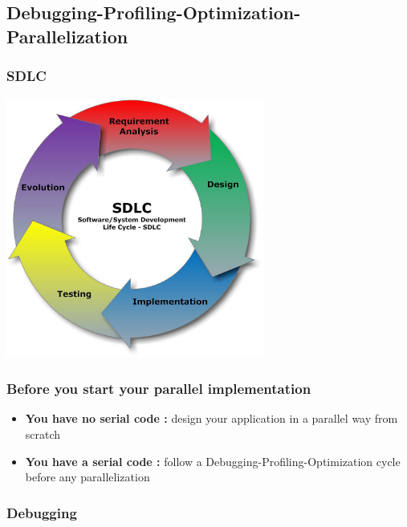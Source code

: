 \subsection{Debugging-Profiling-Optimization-Parallelization}

\begin{frame}[containsverbatim]
	\frametitle{SDLC}
	\includegraphics[width=85mm]{Day1/images/SDLC.jpg}
\end{frame}



\begin{frame}
	\frametitle{Before you start your parallel implementation}

	\begin{itemize}
	\item {\bf You have no serial code : } design your application in a parallel way from scratch
	\item {\bf You have a serial code :} follow a Debugging-Profiling-Optimization cycle before any parallelization
	\end{itemize}
\end{frame}

\subsubsection{Debugging}

